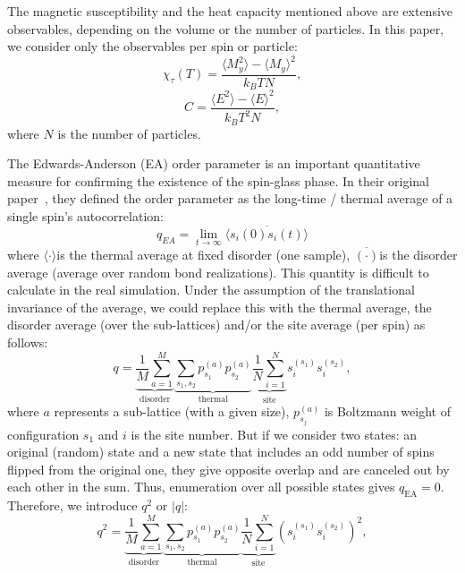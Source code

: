 \documentclass[
    aps,
    prb,
    reprint,           %
    superscriptaddress,%
    amsmath,amssymb,
    floatfix
]{revtex4-2}
\begin{document}
The magnetic susceptibility and the heat capacity mentioned above are extensive observables, depending on the volume or the number of particles. In this paper, we consider only the observables per spin or particle:
\begin{equation}
 \chi_{\tau }\left(T\right)=\frac{\langle M_y^{2}\rangle-\langle M_y\rangle^{2}}{k_{B}TN},
  \label{eq:mag-per-spin}
\end{equation}
\begin{equation}
C=\frac{\langle E^{2}\rangle -{\langle E\rangle }^{2}}{k_{B}T^{2}N},
 \label{eq:cap-per-spin}
\end{equation}
where $N$ is the number of particles. 

The Edwards-Anderson (EA)  order parameter is an important quantitative measure for confirming the existence of the spin-glass phase. In their original paper~\cite{EA1975}, they defined the order parameter as the long-time / thermal average of a single spin's autocorrelation:
\begin{equation}
q_{EA}=\underset{t\rightarrow \infty }{\lim}\overline{\langle s_i(0) s_i\left(t\right)\rangle }	
 \label{eq:15}
\end{equation}
where $\langle \cdot\rangle$is the thermal average at fixed disorder (one sample), $\overline{(\cdot )}$is the disorder average (average over random bond realizations). This quantity is difficult to calculate in the real simulation. Under the assumption of the translational invariance of the average, we could replace this with the thermal average, the disorder average (over the sub-lattices) and/or the site average (per spin) as follows:
\begin{equation}
q=\underset{\text{disorder}}{\underbrace{\frac{1}{M}\sum_{a=1}^{M}}}\underset{\text{thermal}}{\underbrace{\sum_{s_1,s_2} p_{s_1}^{(a)}p_{s_2}^{(a)}}}\underset{\text{site}}{\underbrace{\frac{1}{N}\sum_{i=1}^{N}}}s_i^{\left(s_1\right)}s_i^{\left(s_2\right)},
 \label{eq:16}
\end{equation} 
where $a$ represents a sub-lattice (with a given size), $p_{s_j}^{(a)}$ is Boltzmann weight of configuration $s_1$ and $i$ is the site number. But if we consider two states: an original (random) state and a new state that includes an odd number of spins flipped from the original one, they give opposite overlap and are canceled out by each other in the sum. Thus, enumeration over all possible states gives $q_{\mathrm{EA}}=0$. Therefore, we introduce $q^2$ or $|q|$:
\begin{equation}
 q^{2}=\underset{\text{disorder}}{\underbrace{\frac{1}{M}\sum_{a=1}^{M}}}\underset{\text{thermal}}{\underbrace{\sum_{s_1,s_2} p_{s_1}^{(a)}p_{s_2}^{(a)}}}\underset{\text{site}}{\underbrace{\frac{1}{N}\sum_{i=1}^{N}}}{\left(s_i^{\left(s_1\right)}s_i^{\left(s_2\right)}\right)}^{2},
  \label{eq:17}
\end{equation}
\end{document}
